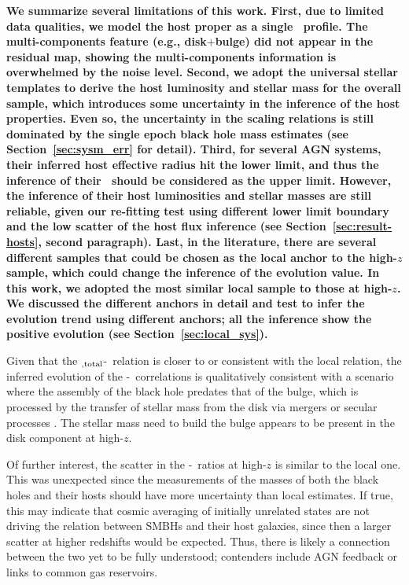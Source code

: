 \documentclass[apj]{emulateapj}
\begin{document}
{\bf We summarize several limitations of this work. First, due to limited data qualities, we model the host proper as a single \sersic\ profile. The multi-components feature (e.g., disk$+$bulge) did not appear in the residual map, showing the multi-components information is overwhelmed by the noise level. 
Second, we adopt the universal stellar templates to derive the host luminosity and stellar mass for the overall sample, which introduces some uncertainty in the inference of the host properties. Even so, the uncertainty in the scaling relations is still dominated by the single epoch black hole mass estimates (see Section~\ref{sec:sysm_err} for detail). Third, for several AGN systems, their inferred host effective radius hit the lower limit, and thus the inference of their \Reff\ should be considered as the upper limit. However, the inference of their host luminosities and stellar masses are still reliable, given our re-fitting test using different lower limit boundary and the low scatter of the host flux inference (see Section~\ref{sec:result-hosts}, second paragraph). Last, in the literature, there are several different samples that could be chosen as the local anchor to the high-$z$ sample, which could change the inference of the evolution value. In this work, we adopted the most similar local sample to those at high-$z$. We discussed the different anchors in detail and test to infer the evolution trend using different anchors; all the inference show the positive evolution  (see Section~\ref{sec:local_sys}).}

Given that the \smass$_{\rm ,total}$-\mbh\ relation is closer to or consistent with the local relation, the inferred evolution of the \bmass-\mbh\ correlations is qualitatively consistent with a scenario where the assembly of the black hole predates that of the bulge, which is processed by the transfer of stellar mass from the disk via mergers or secular processes \citep{Croton2006}. The stellar mass need to build the bulge appears to be present in the disk component at high-$z$.

Of further interest, the scatter in the \mbh-\smass\ ratios at high-$z$ is similar to the local one. This was unexpected since the measurements of the masses of both the black holes and their hosts should have more uncertainty than local estimates. If true, this may indicate that cosmic averaging of initially unrelated states \citep{Peng2007} are not driving the relation between SMBHs and their host galaxies, since then a larger scatter at higher redshifts would be expected. Thus, there is likely a connection between the two yet to be fully understood; contenders include AGN feedback or links to common gas reservoirs.
\end{document}
